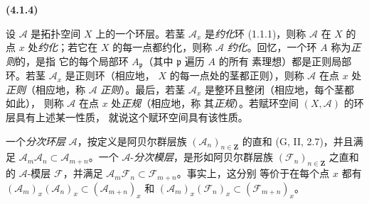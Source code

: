 \documentclass[UTF8,fontset=none,11pt,oneside,openany]{ctexbook}
\newenvironment{env}[1][]{%
  \par\medskip\noindent\textbf{(#1)}\ %
}{\par}
\let\EGAOriginalLabel\label
\renewcommand{\label}[1]{\phantomsection\EGAOriginalLabel{#1}}
\begin{document}
\begin{env}[4.1.4]
\label{0.4.1.4-fr}
设 $\mathcal{A}$ 是拓扑空间 $X$ 上的一个环层。若茎
$\mathcal{A}_x$ 是\emph{约化}环 (1.1.1)，则称 $\mathcal{A}$ 在
$X$ 的点 $x$ 处\emph{约化}；若它在 $X$ 的每一点都约化，则称
$\mathcal{A}$ \emph{约化}。回忆，一个环 $A$ 称为\emph{正则}的，是指
它的每个局部环 $A_{\mathfrak p}$（其中 $\mathfrak p$ 遍历 $A$ 的所有
素理想）都是正则局部环。若茎 $\mathcal{A}_x$ 是正则环（相应地，
$X$ 的每一点处的茎都正则），则称 $\mathcal{A}$ 在点 $x$ 处
\emph{正则}（相应地，称 $\mathcal{A}$ \emph{正则}）。最后，若茎
$\mathcal{A}_x$ 是整环且整闭（相应地，每个茎都如此），
则称 $\mathcal{A}$ 在点 $x$ 处\emph{正规}（相应地，称
其\emph{正规}）。若赋环空间 $(X,\mathcal{A})$ 的环层具有上述某一性质，
就说这个赋环空间具有该性质。

一个\emph{分次环层} $\mathcal{A}$，按定义是阿贝尔群层族
$(\mathcal{A}_n)_{n\in\mathbf Z}$ 的直和 (G, II, 2.7)，并且满足
$\mathcal{A}_m\mathcal{A}_n\subset\mathcal{A}_{m+n}$。一个
$\mathcal{A}$-\emph{分次模层}，是形如阿贝尔群层族
$(\mathcal{F}_n)_{n\in\mathbf Z}$ 之直和的 $\mathcal{A}$-模层
$\mathcal{F}$，并满足
$\mathcal{A}_m\mathcal{F}_n\subset\mathcal{F}_{m+n}$。事实上，这分别
等价于在每个点 $x$ 都有
$(\mathcal{A}_m)_x(\mathcal{A}_n)_x\subset(\mathcal{A}_{m+n})_x$
和
$(\mathcal{A}_m)_x(\mathcal{F}_n)_x\subset(\mathcal{F}_{m+n})_x$。
\end{env}
\end{document}
